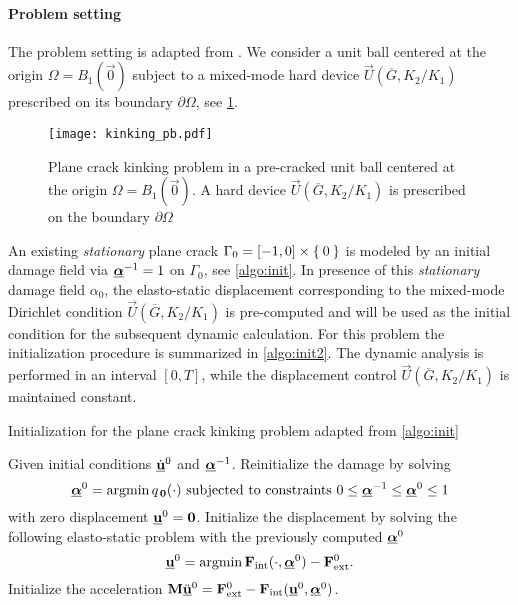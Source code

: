 \paragraph{Problem setting} The problem setting is adapted from \cite{HakimKarma:2005,HakimKarma:2009}. We consider a unit ball centered at the origin $\Omega=B_1(\vec{0})$ subject to a mixed-mode hard device $\vec{U}(\overline{G},K_2/K_1)$ prescribed on its boundary $\partial\Omega$, see \cref{fig:kinking}.
\begin{figure}[htbp]
\centering
\texttt{[image: kinking\_pb.pdf]}
\caption{Plane crack kinking problem in a pre-cracked unit ball centered at the origin $\Omega=B_1(\vec{0})$. A hard device $\vec{U}(\overline{G},K_2/K_1)$ is prescribed on the boundary $\partial\Omega$} \label{fig:kinking}
\end{figure}
An existing \emph{stationary} plane crack $\Gamma_0=[-1,0]\times\Set{0}$ is modeled by an initial damage field via $\dvec^{-1}=1$ on $\Gamma_0$, see \cref{algo:init}. In presence of this \emph{stationary} damage field $\alpha_0$, the elasto-static displacement corresponding to the mixed-mode Dirichlet condition $\vec{U}(\overline{G},K_2/K_1)$ is pre-computed and will be used as the initial condition for the subsequent dynamic calculation. For this problem the initialization procedure is summarized in \cref{algo:init2}. The dynamic analysis is performed in an interval $[0,T]$, while the displacement control $\vec{U}(\overline{G},K_2/K_1)$ is maintained constant.
\begin{algorithm}[htbp]
\caption{Initialization for the plane crack kinking problem adapted from \cref{algo:init}} \label{algo:init2}
\begin{algorithmic}[1]\linespread{1.2}\selectfont\normalsize
\State Given initial conditions $\dot{\uvec}^0$ and $\dvec^{-1}$.
\State Reinitialize the damage by solving
\[
\dvec^0=\operatorname{arg min}q_{\,\vec{0}}(\cdot)\text{ subjected to constraints $0\leq\dvec^{-1}\leq\dvec^0\leq 1$}
\]
with zero displacement $\uvec^0=\vec{0}$.
\State Initialize the displacement by solving the following elasto-static problem with the previously computed $\dvec^0$
\[
\uvec^0=\operatorname{arg min}\vec{F}_\mathrm{int}(\cdot,\dvec^0)-\vec{F}_\mathrm{ext}^0.
\]
\State Initialize the acceleration $\vec{M}\ddot{\uvec}^0=\vec{F}_\mathrm{ext}^0-\vec{F}_\mathrm{int}(\uvec^0,\dvec^0)$.
\end{algorithmic}
\end{algorithm}

